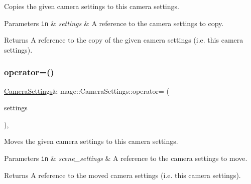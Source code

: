 Copies the given camera settings to this camera settings.


\begin{DoxyParams}[1]{Parameters}
\mbox{\tt in}  & {\em settings} & A reference to the camera settings to copy. \\
\hline
\end{DoxyParams}
\begin{DoxyReturn}{Returns}
A reference to the copy of the given camera settings (i.\+e. this camera settings). 
\end{DoxyReturn}
\hypertarget{classmage_1_1_camera_settings_a201c68e760a9d05e7ee4b76288dcf8b6}{}\label{classmage_1_1_camera_settings_a201c68e760a9d05e7ee4b76288dcf8b6} 
\subsubsection{\texorpdfstring{operator=()}{operator=()}\hspace{0.1cm}{\footnotesize\ttfamily [2/2]}}
{\footnotesize\ttfamily \hyperlink{classmage_1_1_camera_settings}{Camera\+Settings}\& mage\+::\+Camera\+Settings\+::operator= (\begin{DoxyParamCaption}\item[{\hyperlink{classmage_1_1_camera_settings}{Camera\+Settings} \&\&}]{settings }\end{DoxyParamCaption})\hspace{0.3cm}{\ttfamily [default]}, {\ttfamily [noexcept]}}

Moves the given camera settings to this camera settings.


\begin{DoxyParams}[1]{Parameters}
\mbox{\tt in}  & {\em scene\+\_\+settings} & A reference to the camera settings to move. \\
\hline
\end{DoxyParams}
\begin{DoxyReturn}{Returns}
A reference to the moved camera settings (i.\+e. this camera settings). 
\end{DoxyReturn}
\hypertarget{classmage_1_1_camera_settings_a358ab9da30af67ca8b1ea2a5eb5a2710}{}\label{classmage_1_1_camera_settings_a358ab9da30af67ca8b1ea2a5eb5a2710} 
